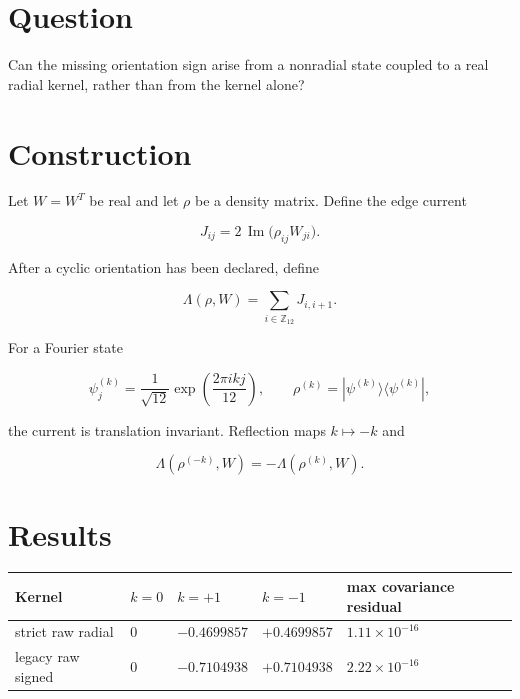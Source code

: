 \documentclass[11pt,a4paper,openany]{report}
\begin{document}
\section{Question}

Can the missing orientation sign arise from a nonradial state coupled to a real radial kernel, rather than from the kernel alone?

\section{Construction}

Let \(W=W^T\) be real and let \(\rho\) be a density matrix. Define the edge current

\[
J_{ij}
=
2\,\operatorname{Im}
\bigl(\rho_{ij}W_{ji}\bigr).
\]

After a cyclic orientation has been declared, define

\[
\Lambda(\rho,W)
=
\sum_{i\in\mathbb Z_{12}}J_{i,i+1}.
\]

For a Fourier state

\[
\psi^{(k)}_j
=
\frac1{\sqrt{12}}
\exp\left(\frac{2\pi ikj}{12}\right),
\qquad
\rho^{(k)}=|\psi^{(k)}\rangle\langle\psi^{(k)}|,
\]

the current is translation invariant. Reflection maps \(k\mapsto-k\) and

\[
\Lambda(\rho^{(-k)},W)
=
-\Lambda(\rho^{(k)},W).
\]

\section{Results}

\begin{center}
\begingroup\footnotesize
\setlength{\tabcolsep}{3.5pt}
\renewcommand{\arraystretch}{1.16}
\begin{longtable}{@{}p{}p{}p{}p{}p{}@{}}
\toprule
\textbf{Kernel} & \textbf{\(k=0\)} & \textbf{\(k=+1\)} & \textbf{\(k=-1\)} & \textbf{max covariance residual} \\
\midrule
\endhead
strict raw radial & 0 & \(-0.4699857\) & \(+0.4699857\) & \(1.11\times10^{-16}\) \\
legacy raw signed & 0 & \(-0.7104938\) & \(+0.7104938\) & \(2.22\times10^{-16}\) \\
\bottomrule
\end{longtable}
\endgroup
\end{center}
\end{document}
